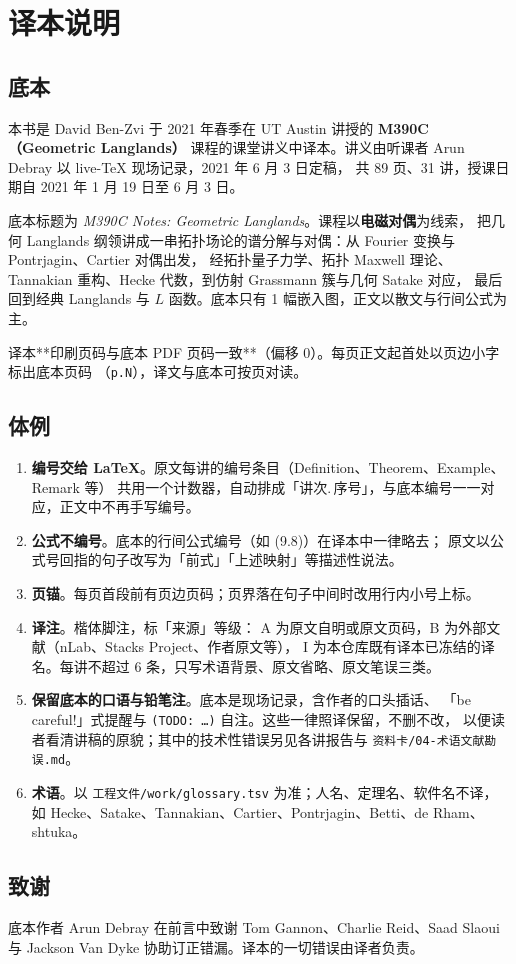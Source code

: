 \chapter*{译本说明}

\section*{底本}

本书是 David Ben-Zvi 于 2021 年春季在 UT Austin 讲授的 \textbf{M390C（Geometric Langlands）}
课程的课堂讲义中译本。讲义由听课者 Arun Debray 以 live-\TeX{} 现场记录，2021 年 6 月 3 日定稿，
共 89 页、31 讲，授课日期自 2021 年 1 月 19 日至 6 月 3 日。

底本标题为 \textit{M390C Notes: Geometric Langlands}。课程以\textbf{电磁对偶}为线索，
把几何 Langlands 纲领讲成一串拓扑场论的谱分解与对偶：从 Fourier 变换与 Pontrjagin、Cartier 对偶出发，
经拓扑量子力学、拓扑 Maxwell 理论、Tannakian 重构、Hecke 代数，到仿射 Grassmann 簇与几何 Satake 对应，
最后回到经典 Langlands 与 $L$ 函数。底本只有 1 幅嵌入图，正文以散文与行间公式为主。

译本**印刷页码与底本 PDF 页码一致**（偏移 0）。每页正文起首处以页边小字标出底本页码
（\texttt{p.\!N}），译文与底本可按页对读。

\section*{体例}

\begin{enumerate}[leftmargin=2.2em,itemsep=0.2em]
\item \textbf{编号交给 \LaTeX}。原文每讲的编号条目（Definition、Theorem、Example、Remark 等）
      共用一个计数器，自动排成「讲次.\,序号」，与底本编号一一对应，正文中不再手写编号。
\item \textbf{公式不编号}。底本的行间公式编号（如 (9.8)）在译本中一律略去；
      原文以公式号回指的句子改写为「前式」「上述映射」等描述性说法。
\item \textbf{页锚}。每页首段前有页边页码；页界落在句子中间时改用行内小号上标。
\item \textbf{译注}。楷体脚注，标「来源」等级：
      A 为原文自明或原文页码，B 为外部文献（nLab、Stacks Project、作者原文等），
      I 为本仓库既有译本已冻结的译名。每讲不超过 6 条，只写术语背景、原文省略、原文笔误三类。
\item \textbf{保留底本的口语与铅笔注}。底本是现场记录，含作者的口头插话、
      「be careful!」式提醒与 \texttt{(TODO: \ldots)} 自注。这些一律照译保留，不删不改，
      以便读者看清讲稿的原貌；其中的技术性错误另见各讲报告与
      \texttt{资料卡/04-术语文献勘误.md}。
\item \textbf{术语}。以 \texttt{工程文件/work/glossary.tsv} 为准；人名、定理名、软件名不译，
      如 Hecke、Satake、Tannakian、Cartier、Pontrjagin、Betti、de Rham、shtuka。
\end{enumerate}

\section*{致谢}

底本作者 Arun Debray 在前言中致谢 Tom Gannon、Charlie Reid、Saad Slaoui 与 Jackson Van Dyke
协助订正错漏。译本的一切错误由译者负责。
